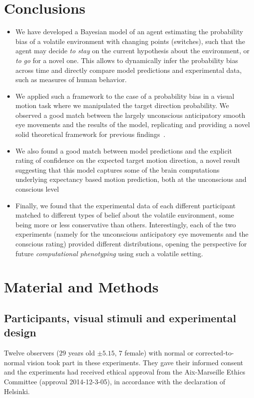 \documentclass[12pt,english]{article}%
\newcommand{\citep}[1]{\parencite{#1}}
\begin{document}
\section{Conclusions}
\begin{itemize}\setlength{\itemsep}{0ex}
\item We have developed a Bayesian model of an agent estimating the probability bias of a volatile environment with changing points (switches), such that the agent may decide \textit{to stay} on the current hypothesis about the environment, or \textit{to go} for a novel one. This allows to dynamically infer the probability bias across time and directly compare model predictions and experimental data, such as measures of human behavior.
\item We applied such a framework to the case of a probability bias in a visual motion task where we manipulated the target direction probability. We observed a good match between the largely unconscious anticipatory smooth eye movements and the results of the model, replicating and providing a novel solid theoretical framework for previous findings~\citep{Montagnini2010, SantosKowler2017, Damasse18}.
\item We also found a good match between model predictions and the explicit rating of confidence on the expected target motion direction, a novel result suggesting that this model captures some of the brain computations underlying expectancy based motion prediction, both at the unconscious and conscious level
\item Finally, we found that the experimental data of each different participant matched to different types of belief about the volatile environment, some being more or less conservative than others. Interestingly, each of the two experiments (namely for the unconscious anticipatory eye movements and the conscious rating) provided different distributions, opening the perspective for future \emph{computational phenotyping} using such a volatile setting.
\end{itemize}
\section{Material and Methods}
\subsection{Participants, visual stimuli and experimental design}
Twelve observers ($29$ years old $\pm 5.15$, $7$ female) with normal or corrected-to-normal vision took part in these experiments. They gave their informed consent and the experiments had received ethical approval from the Aix-Marseille Ethics Committee (approval 2014-12-3-05), in accordance with the declaration of Helsinki.
\end{document}
